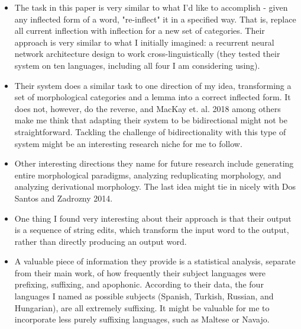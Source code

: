 \documentclass[12pt]{report}
\begin{document}
\begin{itemize}
	
	\item The task in this paper is very similar to what I'd like to accomplish - given any inflected form of a word, "re-inflect" it in a specified way. That is, replace all current inflection with inflection for a new set of categories. Their approach is very similar to what I initially imagined: a recurrent neural network architecture design to work cross-linguistically (they tested their system on ten languages, including all four I am considering using). 
	
	\item Their system does a similar task to one direction of my idea, transforming a set of morphological categories and a lemma into a correct inflected form. It does not, however, do the reverse, and MacKay et. al. 2018 among others make me think that adapting their system to be bidirectional might not be straightforward. Tackling the challenge of bidirectionality with this type of system might be an interesting research niche for me to follow. 
	
	\item Other interesting directions they name for future research include generating entire morphological paradigms, analyzing reduplicating morphology, and analyzing derivational morphology. The last idea might tie in nicely with Dos Santos and Zadrozny 2014.
	
	\item One thing I found very interesting about their approach is that their output is a sequence of string edits, which transform the input word to the output, rather than directly producing an output word. 
	
	\item A valuable piece of information they provide is a statistical analysis, separate from their main work, of how frequently their subject languages were prefixing, suffixing, and apophonic. According to their data, the four languages I named as possible subjects (Spanish, Turkish, Russian, and Hungarian), are all extremely suffixing. It might be valuable for me to incorporate less purely suffixing languages, such as Maltese or Navajo.
	
\end{itemize}

\end{document}
